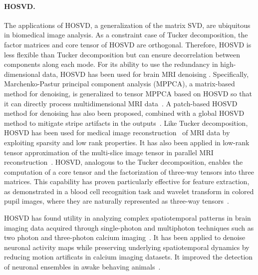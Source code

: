 \paragraph{HOSVD.} The applications of HOSVD, a generalization of the matrix SVD, are ubiquitous in biomedical image analysis. As a constraint case of Tucker decomposition, the factor matrices and core tensor of HOSVD are orthogonal. Therefore, HOSVD is less flexible than Tucker decomposition but can ensure decorrelation between components along each mode. For its ability to use the redundancy in high-dimensional data, HOSVD has been used for brain MRI denoising \cite{fu20163d, zhang2017denoise, bustin2019high, wang2020modified, kim2021denoising, olesen2023tensor}. Specifically,
Marchenko-Pastur principal component analysis (MPPCA), a matrix-based method for denoising, is generalized to tensor MPPCA based on HOSVD so that it can directly process multidimensional MRI data~\cite{olesen2023tensor}. A patch-based HOSVD method for denoising has also been proposed, combined with a global HOSVD method to mitigate stripe artifacts in the outputs~\cite{zhang2017denoise}.  
Like Tucker decomposition, HOSVD has been used for medical image reconstruction~\cite{liu2021calibrationless, yi2021joint, roohi2016dynamic, zhang2022compressed} of MRI data by exploiting sparsity and low rank properties. It has also been applied in low-rank tensor approximation of the multi-slice image tensor in parallel MRI reconstruction~\cite{liu2021calibrationless}. HOSVD, analogous to the Tucker decomposition, enables the computation of a core tensor and the factorization of three-way tensors into three matrices. This capability has proven particularly effective for feature extraction, as demonstrated in a blood cell recognition task and wavelet transform in colored pupil images, where they are naturally represented as three-way tensors~\cite{le2023tensor,giap2023adaptive}. 

HOSVD has found utility in analyzing complex spatiotemporal patterns in brain imaging data acquired through single-photon and multiphoton techniques such as two photon and three-photon calcium imaging~\cite{grewe2010high}. It has been applied to denoise neuronal activity maps while preserving underlying spatiotemporal dynamics by reducing motion artificats in calcium imaging datasets. It improved the detection of neuronal ensembles in awake behaving animals~\cite{cho2023robust}. 




